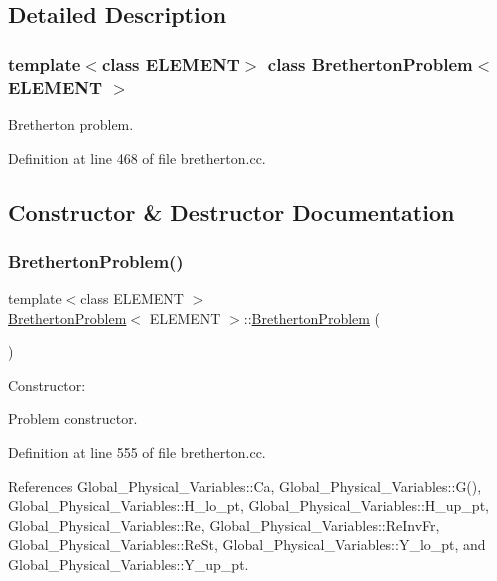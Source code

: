 \subsection{Detailed Description}
\subsubsection*{template$<$class E\+L\+E\+M\+E\+NT$>$\newline
class Bretherton\+Problem$<$ E\+L\+E\+M\+E\+N\+T $>$}

Bretherton problem. 

Definition at line 468 of file bretherton.\+cc.



\subsection{Constructor \& Destructor Documentation}
\mbox{\label{classBrethertonProblem_a207cdfe4cf60e83257e759b1ac15e5eb}} 
\subsubsection{\texorpdfstring{Bretherton\+Problem()}{BrethertonProblem()}}
{\footnotesize\ttfamily template$<$class E\+L\+E\+M\+E\+NT $>$ \\
\hyperlink{classBrethertonProblem}{Bretherton\+Problem}$<$ E\+L\+E\+M\+E\+NT $>$\+::\hyperlink{classBrethertonProblem}{Bretherton\+Problem} (\begin{DoxyParamCaption}{ }\end{DoxyParamCaption})}



Constructor\+: 

Problem constructor. 

Definition at line 555 of file bretherton.\+cc.



References Global\+\_\+\+Physical\+\_\+\+Variables\+::\+Ca, Global\+\_\+\+Physical\+\_\+\+Variables\+::\+G(), Global\+\_\+\+Physical\+\_\+\+Variables\+::\+H\+\_\+lo\+\_\+pt, Global\+\_\+\+Physical\+\_\+\+Variables\+::\+H\+\_\+up\+\_\+pt, Global\+\_\+\+Physical\+\_\+\+Variables\+::\+Re, Global\+\_\+\+Physical\+\_\+\+Variables\+::\+Re\+Inv\+Fr, Global\+\_\+\+Physical\+\_\+\+Variables\+::\+Re\+St, Global\+\_\+\+Physical\+\_\+\+Variables\+::\+Y\+\_\+lo\+\_\+pt, and Global\+\_\+\+Physical\+\_\+\+Variables\+::\+Y\+\_\+up\+\_\+pt.



